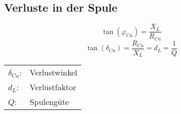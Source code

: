 



\subsection{Verluste in der Spule}
\[ \tan(\varphi_{Cu}) = \frac{X_L}{R_{Cu}} \]
\[ \tan(\delta_{Cu}) = \frac{R_{Cu}}{X_L} = d_L = \frac{1}{Q} \]
\begin{tabular}{@{}ll}
  $\delta_{Cu}$:    & Verlustwinkel \\
  $d_L$:            & Verlustfaktor \\
  $Q$:              & Spulengüte
\end{tabular}